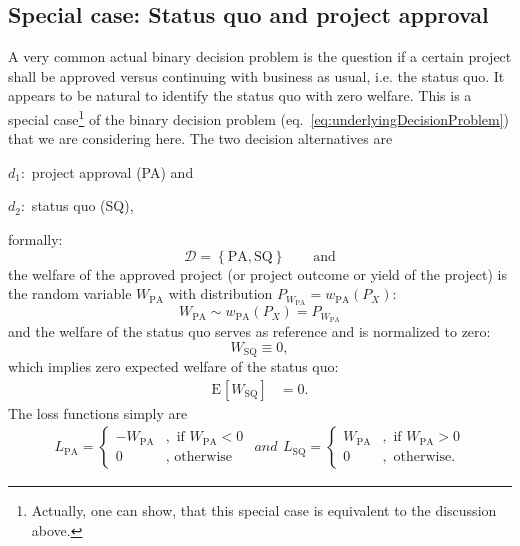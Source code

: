 \documentclass[a4paper,10pt,twoside,pagesize,abstracton]{scrartcl}
\newcommand{\E}[2][]{\mathrm{E}_{#1}\left[#2\right]} %
\newcommand{\PA}{\mathrm{PA}} %
\newcommand{\SQ}{\mathrm{SQ}} %
\theoremstyle{plain}%
\theoremstyle{definition}
\theoremstyle{remark}
\begin{document}
\subsection{Special case: Status quo and project approval}
A very common actual binary decision problem is the question if a certain project shall be approved versus continuing with business as usual, i.e. the status quo. It appears to be natural to identify the status quo with zero welfare. This is a special case\footnote{%
  Actually, one can show, that this special case is equivalent to the discussion above.%
}%
 of the binary decision problem (eq.~\ref{eq:underlyingDecisionProblem}) that we are considering here. The two decision alternatives are
\begin{inparadesc}
  \item[$d_1:$] project approval (PA) and 
  \item[$d_2:$] status quo (SQ),
\end{inparadesc}
formally:
\begin{equation}
 \mathcal{D} = \left\{ \PA, \SQ \right\}  \qquad \mathrm{and}
\end{equation}
the welfare of the approved project (or project outcome or yield of the project) is the random variable $W_\PA$ with distribution $P_{W_\PA} = w_\PA(P_X)$:
\begin{equation}
  W_\PA \sim w_\PA(P_X) = P_{W_\PA}
\end{equation}
and the welfare of the status quo serves as reference and is normalized to zero:
\begin{equation}\label{eq:SQPADefNormalization}
 W_\SQ \equiv 0,
\end{equation}
which implies zero expected welfare of the status quo:
\begin{align}
  \label{eq:SQPA_W_SQ_0}
 \E{W_\SQ} 	&= 0.
\end{align}
The loss functions simply are 
\begin{subequations}
 \begin{align}
  L_\PA = 
    \begin{cases} 
     -  W_\PA&, \textrm{~if~}  W_\PA  < 0\\
     0 &, \textrm{~otherwise}
    \end{cases}
 \end{align}
and 
 \begin{align}
  L_\SQ = 
    \begin{cases} 
     W_\PA&, \textrm{~if~}  W_\PA  > 0\\
     0 &, \textrm{~otherwise}.
    \end{cases}
 \end{align}
\end{subequations}
\end{document}
